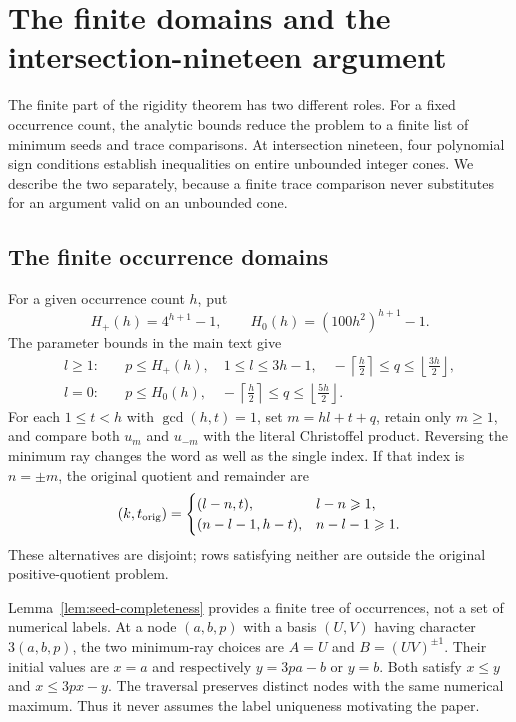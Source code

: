 \section{The finite domains and the intersection-nineteen argument}
\label{sec:finite-domains}

The finite part of the rigidity theorem has two different roles. For a fixed occurrence count, the analytic bounds reduce the problem to a finite list of minimum seeds and trace comparisons. At intersection nineteen, four polynomial sign conditions establish inequalities on entire unbounded integer cones. We describe the two separately, because a finite trace comparison never substitutes for an argument valid on an unbounded cone.

\subsection{The finite occurrence domains}
\label{subsec:occurrence-domains}

For a given occurrence count $h$, put
$$
 H_+(h)=4^{h+1}-1,\qquad H_0(h)=(100h^2)^{h+1}-1.
$$
The parameter bounds in the main text give
\begin{align}
 l\geqslant1:\quad &p\leqslant H_+(h),\quad 1\leqslant l\leqslant3h-1,\quad
 -\left\lceil\frac h2\right\rceil\leqslant q\leqslant\left\lfloor\frac{3h}2\right\rfloor,
 \label{eq:positive-domain}\\
 l=0:\quad &p\leqslant H_0(h),\quad
 -\left\lceil\frac h2\right\rceil\leqslant q\leqslant\left\lfloor\frac{5h}2\right\rfloor.
 \label{eq:minimum-domain}
\end{align}
For each $1\leqslant t<h$ with $\gcd(h,t)=1$, set $m=hl+t+q$, retain only $m\geqslant1$, and compare both $u_m$ and $u_{-m}$ with the literal Christoffel product. Reversing the minimum ray changes the word as well as the single index. If that index is $n=\pm m$, the original quotient and remainder are
\begin{equation}
 (k,t_{\rm orig})=
 \begin{cases}
 (l-n,t),&l-n\geqslant1,\\
 (n-l-1,h-t),&n-l-1\geqslant1.
 \end{cases}
 \label{eq:original-type}
\end{equation}
These alternatives are disjoint; rows satisfying neither are outside the original positive-quotient problem.

Lemma~\ref{lem:seed-completeness} provides a finite tree of occurrences, not a set of numerical labels. At a node $(a,b,p)$ with a basis $(U,V)$ having character $3(a,b,p)$, the two minimum-ray choices are $A=U$ and $B=(UV)^{\pm1}$. Their initial values are $x=a$ and respectively $y=3pa-b$ or $y=b$. Both satisfy $x\leqslant y$ and $x\leqslant3px-y$. The traversal preserves distinct nodes with the same numerical maximum. Thus it never assumes the label uniqueness motivating the paper.

